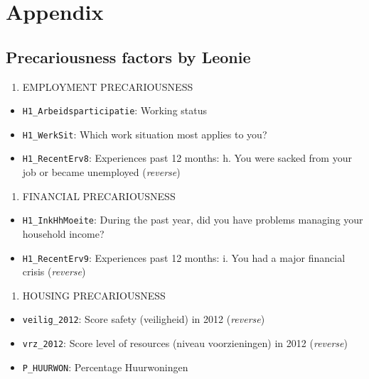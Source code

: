 \documentclass[
]{article}
\providecommand{\tightlist}{%
  \setlength{\itemsep}{0pt}\setlength{\parskip}{0pt}}\usepackage{longtable,booktabs,array}
\begin{document}
\section{Appendix}\label{sec-appendix}

\subsection{Precariousness factors by
Leonie}\label{precariousness-factors-by-leonie}

\begin{enumerate}
\def\labelenumi{\arabic{enumi}.}
\tightlist
\item
  EMPLOYMENT PRECARIOUSNESS
\end{enumerate}

\begin{itemize}
\tightlist
\item
  \texttt{H1\_Arbeidsparticipatie}: Working status
\item
  \texttt{H1\_WerkSit}: Which work situation most applies to you?
\item
  \texttt{H1\_RecentErv8}: Experiences past 12 months: h. You were
  sacked from your job or became unemployed (\emph{reverse})
\end{itemize}

\begin{enumerate}
\def\labelenumi{\arabic{enumi}.}
\setcounter{enumi}{1}
\tightlist
\item
  FINANCIAL PRECARIOUSNESS
\end{enumerate}

\begin{itemize}
\tightlist
\item
  \texttt{H1\_InkHhMoeite}: During the past year, did you have problems
  managing your household income?
\item
  \texttt{H1\_RecentErv9}: Experiences past 12 months: i. You had a
  major financial crisis (\emph{reverse})
\end{itemize}

\begin{enumerate}
\def\labelenumi{\arabic{enumi}.}
\setcounter{enumi}{2}
\tightlist
\item
  HOUSING PRECARIOUSNESS
\end{enumerate}

\begin{itemize}
\tightlist
\item
  \texttt{veilig\_2012}: Score safety (veiligheid) in 2012
  (\emph{reverse})
\item
  \texttt{vrz\_2012}: Score level of resources (niveau voorzieningen) in
  2012 (\emph{reverse})
\item
  \texttt{P\_HUURWON}: Percentage Huurwoningen
\end{itemize}
\end{document}
